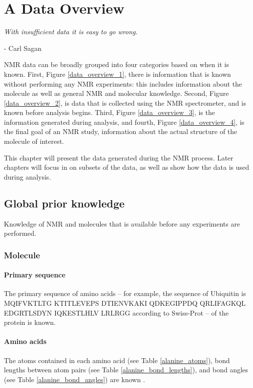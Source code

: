 \chapter{A Data Overview}
\label{ch_data_overview}

\begin{center}
  \textit{With insufficient data it is easy to go wrong.}

 - Carl Sagan
\end{center}

NMR data can be broadly grouped into four categories based on when it
is known.  First, Figure \ref{data_overview_1}, 
there is information that is known without performing
any NMR experiments: this includes information about the molecule as well
as general NMR and molecular knowledge.  Second,
Figure \ref{data_overview_2}, is data that is 
collected using the NMR spectrometer, and is known before analysis begins.  
Third, Figure \ref{data_overview_3}, is the information generated during 
analysis, and fourth, Figure \ref{data_overview_4}, is the final goal of 
an NMR study, information about the actual structure of the molecule of 
interest.

This chapter will present the data generated during the NMR process.
Later chapters will focus in on subsets of the data, as well as show how
the data is used during analysis.


\section{Global prior knowledge}
Knowledge of NMR and molecules that is available before any experiments are
performed.

\subsection*{Molecule}

\subsubsection{Primary sequence}
The primary sequence of amino acids -- for example, the sequence of Ubiquitin
is MQIFVKTLTG KTITLEVEPS DTIENVKAKI QDKEGIPPDQ QRLIFAGKQL EDGRTLSDYN IQKESTLHLV LRLRGG
according to Swiss-Prot -- of the protein is known.  

\subsubsection{Amino acids}
The atoms contained in each amino acid (see Table \ref{alanine_atoms}), 
bond lengths between atom pairs (see Table \ref{alanine_bond_lengths}), 
and bond angles (see Table \ref{alanine_bond_angles}) are known 
\cite{alanine_sreepad}.

